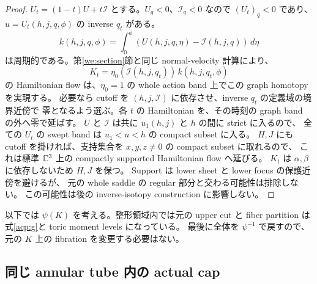 \begin{proof}
$U_t=(1-t)U+t\mathcal I$ とする。$U_q<0$、$\mathcal I_q<0$ なので
$(U_t)_q<0$ であり、$u=U_t(h,j,q,\phi)$ の inverse $q_t$ がある。
\[
 k(h,j,q,\phi)=\int_0^\phi(U(h,j,q,\eta)-\mathcal I(h,j,q))\,d\eta
\]
は周期的である。第\ref{we:section}節と同じ normal-velocity 計算により、
\[
 K_t=\eta_0(\mathcal I(h,j,q_t))\,k(h,j,q_t,\phi)
\]
の Hamiltonian flow は、$\eta_0=1$ の whole action band 上でこの graph homotopy を実現する。
必要なら cutoff を $(h,j,\mathcal I)$ に依存させ、inverse $q_t$ の定義域の境界近傍で
零となるよう選ぶ。各 $t$ の Hamiltonian を、その時刻の graph band の外へ零で延ばす。
$U$ と $\mathcal I$ は共に $u_1(h,j)$ と $h$ の間に strict に入るので、
全ての $U_t$ の swept band は $u_1<u<h$ の compact subset に入る。
$H,J$ にも cutoff を掛ければ、支持集合を $x,y,z\ne0$ の compact subset に取れるので、
これは標準 $\mathbb C^3$ 上の compactly supported Hamiltonian flow へ延びる。
$K_t$ は $\alpha,\beta$ に依存しないため $H,J$ を保つ。
Support は lower sheet と lower focus の保護近傍を避けるが、
元の whole saddle の regular 部分と交わる可能性は排除しない。
この可能性は後の inverse-isotopy construction に影響しない。
\end{proof}

以下では $\psi(K)$ を考える。整形領域内では元の upper cut と fiber partition は
式\eqref{acp:g}と toric moment levels になっている。
最後に全体を $\psi^{-1}$ で戻すので、元の $K$ 上の fibration を変更する必要はない。

\subsection{同じ annular tube 内の actual cap}

